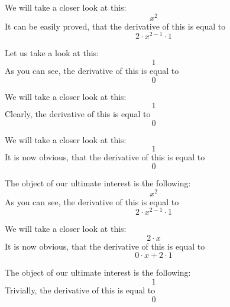 \documentclass{article}
\begin{document}
We will take a closer look at this:
\begin{equation}
x ^{2 } 
\end{equation}
It can be easily proved, that the derivative of this is equal to
\begin{equation}
2 \cdot x ^{2 - 1 } \cdot 1 
\end{equation}

Let us take a look at this:
\begin{equation}
1 
\end{equation}
As you can see, the derivative of this is equal to
\begin{equation}
0 
\end{equation}

We will take a closer look at this:
\begin{equation}
1 
\end{equation}
Clearly, the derivative of this is equal to
\begin{equation}
0 
\end{equation}

We will take a closer look at this:
\begin{equation}
1 
\end{equation}
It is now obvious, that the derivative of this is equal to
\begin{equation}
0 
\end{equation}

The object of our ultimate interest is the following:
\begin{equation}
x ^{2 } 
\end{equation}
As you can see, the derivative of this is equal to
\begin{equation}
2 \cdot x ^{2 - 1 } \cdot 1 
\end{equation}

We will take a closer look at this:
\begin{equation}
2 \cdot x 
\end{equation}
It is now obvious, that the derivative of this is equal to
\begin{equation}
0 \cdot x + 2 \cdot 1 
\end{equation}

The object of our ultimate interest is the following:
\begin{equation}
1 
\end{equation}
Trivially, the derivative of this is equal to
\begin{equation}
0 
\end{equation}
\end{document}
